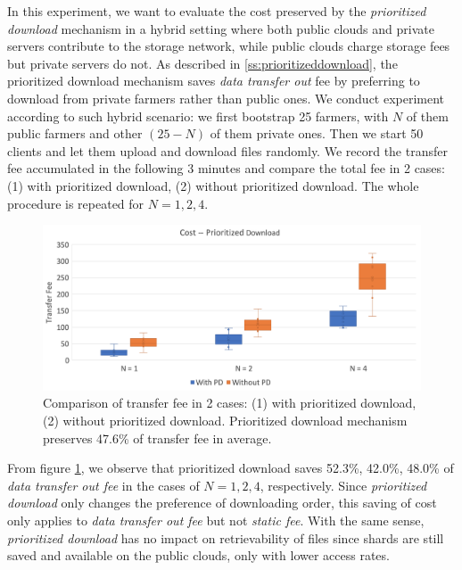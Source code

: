 In this experiment, we want to evaluate the cost preserved by the \textit{prioritized download} mechanism in a hybrid setting where both public clouds and private servers contribute to the storage network, while public clouds charge storage fees but private servers do not. As described in \ref{ss:prioritizeddownload}, the prioritized download mechanism saves \textit{data transfer out} fee by preferring to download from private farmers rather than public ones. We conduct experiment according to such hybrid scenario: we first bootstrap 25 farmers, with $N$ of them public farmers and other $(25-N)$ of them private ones.  Then we start 50 clients and let them upload and download files randomly. We record the transfer fee accumulated in the following 3 minutes and compare the total fee in 2 cases: (1) with prioritized download, (2) without prioritized download. The whole procedure is repeated for $N = 1, 2, 4$.

\begin{figure}[hbt]
  \centering
    \includegraphics[width=14cm]{charts/chart_cost_prioritized_download.png}
    \caption[Comparison of transfer fee in 2 cases: (1) with prioritized download, (2) without prioritized download]{Comparison of transfer fee in 2 cases: (1) with prioritized download, (2) without prioritized download. Prioritized download mechanism preserves 47.6\% of transfer fee in average.}
    \label{fig:costprioritizeddownload}
\end{figure}

From figure \ref{fig:costprioritizeddownload}, we observe that prioritized download saves 52.3\%, 42.0\%, 48.0\% of \textit{data transfer out fee} in the cases of $N = 1, 2, 4$, respectively. Since \textit{prioritized download} only changes the preference of downloading order, this saving of cost only applies to \textit{data transfer out fee} but not \textit{static fee}. With the same sense, \textit{prioritized download} has no impact on retrievability of files since shards are still saved and available on the public clouds, only with lower access rates.



  